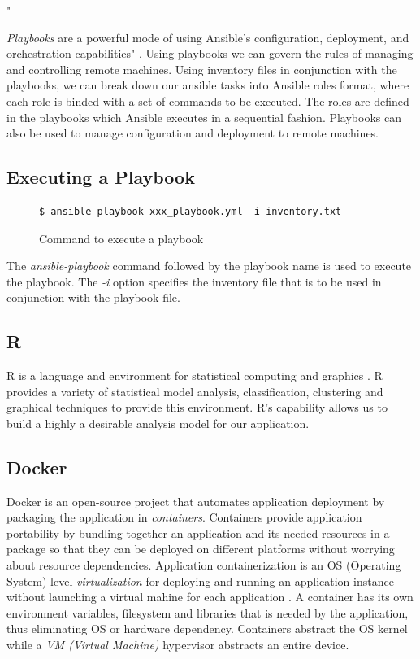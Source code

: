\documentclass[9pt,twocolumn,twoside]{../../styles/osajnl}
\begin{document}
"{\emph{Playbooks} are a powerful mode of using Ansible’s
  configuration, deployment, and orchestration capabilities"
\cite{www-ansible-playbook}. Using playbooks we can govern the rules
of managing and controlling remote machines. Using inventory files in
conjunction with the playbooks, we can break down our ansible tasks
into Ansible roles format, where each role is binded with a set of
commands to be executed. The roles are defined in the playbooks which
Ansible executes in a sequential fashion. Playbooks can also be used
to manage configuration and deployment to remote machines.

\subsection{Executing a Playbook}
\begin{figure}[H]
\begin{verbatim}
$ ansible-playbook xxx_playbook.yml -i inventory.txt
\end{verbatim}
\caption{Command to execute a playbook}
\vspace{-4mm}
\label{Command to execute a playbook}
\end{figure}

\noindent
The \emph{ansible-playbook} command followed by the playbook name is
used to execute the playbook. The \emph{-i} option specifies the
inventory file that is to be used in conjunction with the playbook
file.

\subsection{R}
R is a language and environment for statistical computing and graphics
\cite{www-about-rproject}. R provides a variety of statistical model
analysis, classification, clustering and graphical techniques to
provide this environment. R's capability allows us to build a highly a
desirable analysis model for our application.


\subsection{Docker}

Docker is an open-source project that automates application deployment
by packaging the application in \emph{containers}. Containers provide
application portability by bundling together an application and its
needed resources in a package so that they can be deployed on
different platforms without worrying about resource
dependencies. Application containerization is an OS (Operating System)
level \emph{virtualization} \cite{www-virtualization-wiki} for
deploying and running an application instance without launching a
virtual mahine for each application \cite{www-containerization}. A
container has its own environment variables, filesystem and libraries
that is needed by the application, thus eliminating OS or hardware
dependency. Containers abstract the OS kernel while a \emph{VM
  (Virtual Machine)} \cite{www-virtualmachine-wiki} hypervisor
abstracts an entire device.

}
\end{document}
